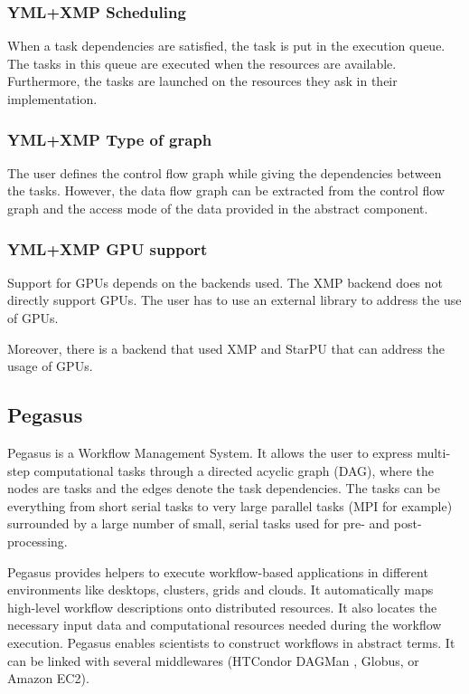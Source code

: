 \subsubsection{YML+XMP Scheduling}
When a task dependencies are satisfied, the task is put in the execution queue.
The tasks in this queue are executed when the resources are available.
Furthermore, the tasks are launched on the resources they ask in their implementation.

\subsubsection{YML+XMP Type of graph}
The user defines the control flow graph while giving the dependencies between the tasks.
However, the data flow graph can be extracted from the control flow graph and the access mode of the data provided in the abstract component.

\subsubsection{YML+XMP GPU support}
Support for GPUs depends on the backends used.
The XMP backend does not directly support GPUs.
The user has to use an external library to address the use of GPUs.

Moreover, there is a backend that used XMP and StarPU that can address the usage of GPUs.




\subsection{Pegasus}
Pegasus \cite{DSSBG2005} \cite{DVJRC2015} is a Workflow Management System.
It allows the user to express multi-step computational tasks through a directed acyclic graph (DAG), where the nodes are tasks and the edges denote the task dependencies.
The tasks can be everything  from short serial tasks to very large parallel tasks (MPI for example) surrounded by a large number of small, serial tasks used for pre- and post-processing.

Pegasus provides helpers to execute workflow-based applications in different environments like desktops, clusters, grids and clouds.
It automatically maps high-level workflow descriptions onto distributed resources.
It also locates the necessary input data and computational resources needed during the workflow execution.
Pegasus enables scientists to construct workflows in abstract terms.
It can be linked with several middlewares (HTCondor DAGMan \cite{ThaTL2002}, Globus, or Amazon EC2).

